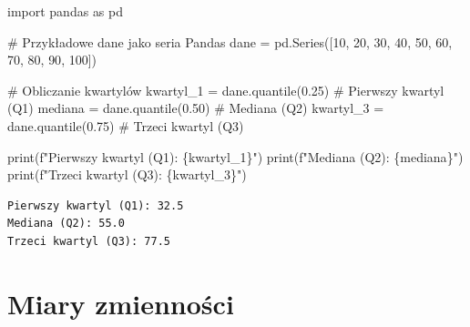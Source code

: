 \documentclass[
  polish,
  letterpaper,
  DIV=11,
  numbers=noendperiod]{scrreprt}
\newenvironment{Shaded}{\begin{snugshade}}{\end{snugshade}}
\newcommand{\BuiltInTok}[1]{\textcolor[rgb]{0.00,0.23,0.31}{#1}}
\newcommand{\CommentTok}[1]{\textcolor[rgb]{0.37,0.37,0.37}{#1}}
\newcommand{\DecValTok}[1]{\textcolor[rgb]{0.68,0.00,0.00}{#1}}
\newcommand{\FloatTok}[1]{\textcolor[rgb]{0.68,0.00,0.00}{#1}}
\newcommand{\ImportTok}[1]{\textcolor[rgb]{0.00,0.46,0.62}{#1}}
\newcommand{\NormalTok}[1]{\textcolor[rgb]{0.00,0.23,0.31}{#1}}
\newcommand{\OperatorTok}[1]{\textcolor[rgb]{0.37,0.37,0.37}{#1}}
\newcommand{\SpecialCharTok}[1]{\textcolor[rgb]{0.37,0.37,0.37}{#1}}
\newcommand{\SpecialStringTok}[1]{\textcolor[rgb]{0.13,0.47,0.30}{#1}}
\begin{document}
\begin{Shaded}
\begin{Highlighting}[]
\ImportTok{import}\NormalTok{ pandas }\ImportTok{as}\NormalTok{ pd}

\CommentTok{\# Przykładowe dane jako seria Pandas}
\NormalTok{dane }\OperatorTok{=}\NormalTok{ pd.Series([}\DecValTok{10}\NormalTok{, }\DecValTok{20}\NormalTok{, }\DecValTok{30}\NormalTok{, }\DecValTok{40}\NormalTok{, }\DecValTok{50}\NormalTok{, }\DecValTok{60}\NormalTok{, }\DecValTok{70}\NormalTok{, }\DecValTok{80}\NormalTok{, }\DecValTok{90}\NormalTok{, }\DecValTok{100}\NormalTok{])}

\CommentTok{\# Obliczanie kwartylów}
\NormalTok{kwartyl\_1 }\OperatorTok{=}\NormalTok{ dane.quantile(}\FloatTok{0.25}\NormalTok{)  }\CommentTok{\# Pierwszy kwartyl (Q1)}
\NormalTok{mediana }\OperatorTok{=}\NormalTok{ dane.quantile(}\FloatTok{0.50}\NormalTok{)    }\CommentTok{\# Mediana (Q2)}
\NormalTok{kwartyl\_3 }\OperatorTok{=}\NormalTok{ dane.quantile(}\FloatTok{0.75}\NormalTok{)  }\CommentTok{\# Trzeci kwartyl (Q3)}

\BuiltInTok{print}\NormalTok{(}\SpecialStringTok{f"Pierwszy kwartyl (Q1): }\SpecialCharTok{\{}\NormalTok{kwartyl\_1}\SpecialCharTok{\}}\SpecialStringTok{"}\NormalTok{)}
\BuiltInTok{print}\NormalTok{(}\SpecialStringTok{f"Mediana (Q2): }\SpecialCharTok{\{}\NormalTok{mediana}\SpecialCharTok{\}}\SpecialStringTok{"}\NormalTok{)}
\BuiltInTok{print}\NormalTok{(}\SpecialStringTok{f"Trzeci kwartyl (Q3): }\SpecialCharTok{\{}\NormalTok{kwartyl\_3}\SpecialCharTok{\}}\SpecialStringTok{"}\NormalTok{)}
\end{Highlighting}
\end{Shaded}

\begin{verbatim}
Pierwszy kwartyl (Q1): 32.5
Mediana (Q2): 55.0
Trzeci kwartyl (Q3): 77.5
\end{verbatim}

\section{Miary zmienności}\label{miary-zmiennoux15bci}
\end{document}
